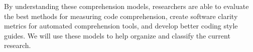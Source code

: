 By understanding these comprehension models, researchers are able to evaluate the best methods for measuring code comprehension, create software clarity metrics for automated comprehension tools, and develop better coding style guides. We will use these models to help organize and classify the current research.
